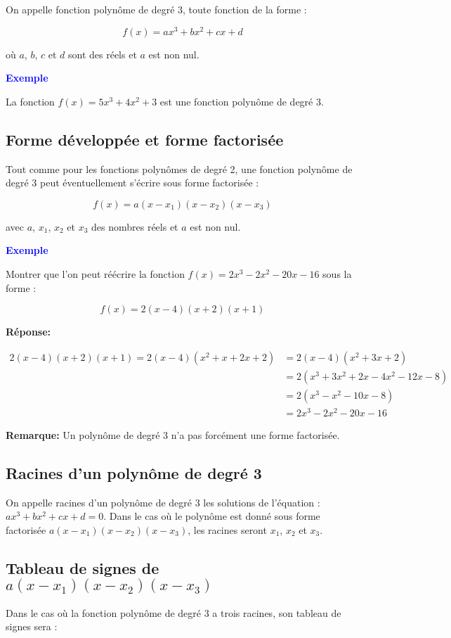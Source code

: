 \documentclass[a4paper,12pt]{article}
\begin{document}
On appelle fonction polynôme de degré 3, toute fonction de la forme :

\[
f(x) = ax^3 + bx^2 + cx + d
\]

où $a$, $b$, $c$ et $d$ sont des réels et $a$ est non nul.

\textbf{\textcolor{blue}{Exemple}} \par

La fonction $f(x) = 5x^3 + 4x^2 + 3$ est une fonction polynôme de degré 3.

\subsection*{Forme développée et forme factorisée}

Tout comme pour les fonctions polynômes de degré 2, une fonction polynôme de degré 3 peut éventuellement s'écrire sous forme factorisée :

\[
f(x) = a(x - x_1)(x - x_2)(x - x_3)
\]

avec $a$, $x_1$, $x_2$ et $x_3$ des nombres réels et $a$ est non nul.

\textbf{\textcolor{blue}{Exemple}} \par

Montrer que l’on peut réécrire la fonction $f(x) = 2x^3 - 2x^2 - 20x - 16$ sous la forme :

\[
f(x) = 2(x - 4)(x + 2)(x + 1)
\]

\textbf{Réponse:}

\begin{align}
  2(x - 4)(x + 2)(x + 1) = 2(x - 4)(x^2 + x + 2x + 2) &= 2(x - 4)(x^2 + 3x + 2) \\
  &= 2(x^3 + 3x^2 + 2x - 4x^2 - 12x - 8) \\
  &= 2(x^3 - x^2 - 10x - 8) \\
  &= 2x^3 - 2x^2 - 20x - 16
\end{align}

\textbf{Remarque:} Un polynôme de degré 3 n’a pas forcément une forme factorisée.

\subsection*{Racines d’un polynôme de degré 3}

On appelle racines d’un polynôme de degré 3 les solutions de l’équation : $ax^3 + bx^2 + cx + d = 0$. Dans le cas où le polynôme est donné sous forme factorisée $a(x - x_1)(x - x_2)(x - x_3)$, les racines seront $x_1$, $x_2$ et $x_3$.

\subsection*{Tableau de signes de $a(x - x_1)(x - x_2)(x - x_3)$}

Dans le cas où la fonction polynôme de degré 3 a trois racines, son tableau de signes sera :
\end{document}
